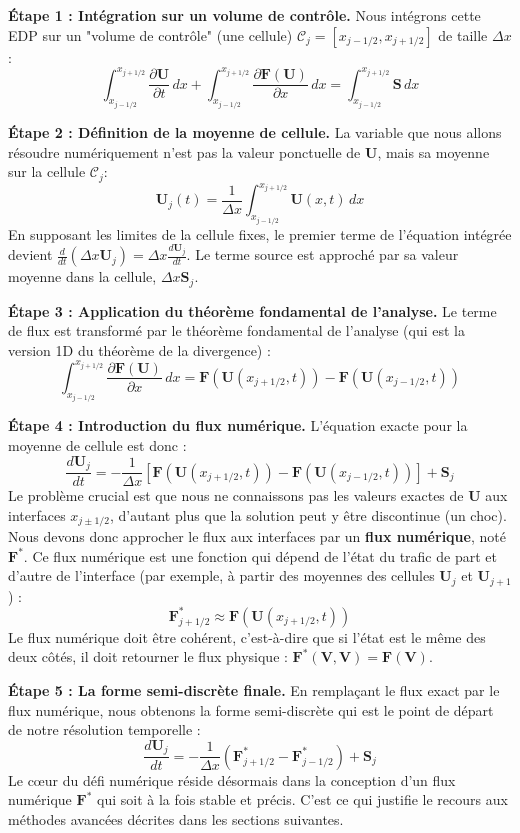 \textbf{Étape 1 : Intégration sur un volume de contrôle.}
Nous intégrons cette EDP sur un "volume de contrôle" (une cellule) $\mathcal{C}_j = [x_{j-1/2}, x_{j+1/2}]$ de taille $\Delta x$:
\[ \int_{x_{j-1/2}}^{x_{j+1/2}} \frac{\partial \mathbf{U}}{\partial t} \,dx + \int_{x_{j-1/2}}^{x_{j+1/2}} \frac{\partial \mathbf{F}(\mathbf{U})}{\partial x} \,dx = \int_{x_{j-1/2}}^{x_{j+1/2}} \mathbf{S} \,dx \]

\textbf{Étape 2 : Définition de la moyenne de cellule.}
La variable que nous allons résoudre numériquement n'est pas la valeur ponctuelle de $\mathbf{U}$, mais sa moyenne sur la cellule $\mathcal{C}_j$:
\[ \mathbf{U}_j(t) = \frac{1}{\Delta x} \int_{x_{j-1/2}}^{x_{j+1/2}} \mathbf{U}(x,t) \,dx \]
En supposant les limites de la cellule fixes, le premier terme de l'équation intégrée devient $\frac{d}{dt} (\Delta x \mathbf{U}_j) = \Delta x \frac{d\mathbf{U}_j}{dt}$. Le terme source est approché par sa valeur moyenne dans la cellule, $\Delta x \mathbf{S}_j$.

\textbf{Étape 3 : Application du théorème fondamental de l'analyse.}
Le terme de flux est transformé par le théorème fondamental de l'analyse (qui est la version 1D du théorème de la divergence) :
\[ \int_{x_{j-1/2}}^{x_{j+1/2}} \frac{\partial \mathbf{F}(\mathbf{U})}{\partial x} \,dx = \mathbf{F}(\mathbf{U}(x_{j+1/2}, t)) - \mathbf{F}(\mathbf{U}(x_{j-1/2}, t)) \]

\textbf{Étape 4 : Introduction du flux numérique.}
L'équation exacte pour la moyenne de cellule est donc :
\[ \frac{d\mathbf{U}_j}{dt} = - \frac{1}{\Delta x} \left[ \mathbf{F}(\mathbf{U}(x_{j+1/2}, t)) - \mathbf{F}(\mathbf{U}(x_{j-1/2}, t)) \right] + \mathbf{S}_j \]
Le problème crucial est que nous ne connaissons pas les valeurs exactes de $\mathbf{U}$ aux interfaces $x_{j\pm1/2}$, d'autant plus que la solution peut y être discontinue (un choc). Nous devons donc approcher le flux aux interfaces par un \textbf{flux numérique}, noté $\mathbf{F}^*$. Ce flux numérique est une fonction qui dépend de l'état du trafic de part et d'autre de l'interface (par exemple, à partir des moyennes des cellules $\mathbf{U}_j$ et $\mathbf{U}_{j+1}$) :
\[ \mathbf{F}^*_{j+1/2} \approx \mathbf{F}(\mathbf{U}(x_{j+1/2}, t)) \]
Le flux numérique doit être cohérent, c'est-à-dire que si l'état est le même des deux côtés, il doit retourner le flux physique : $\mathbf{F}^*(\mathbf{V}, \mathbf{V}) = \mathbf{F}(\mathbf{V})$.

\textbf{Étape 5 : La forme semi-discrète finale.}
En remplaçant le flux exact par le flux numérique, nous obtenons la forme semi-discrète qui est le point de départ de notre résolution temporelle :
\[ \frac{d\mathbf{U}_j}{dt} = - \frac{1}{\Delta x} (\mathbf{F}^*_{j+1/2} - \mathbf{F}^*_{j-1/2}) + \mathbf{S}_j \]
Le cœur du défi numérique réside désormais dans la conception d'un flux numérique $\mathbf{F}^*$ qui soit à la fois stable et précis. C'est ce qui justifie le recours aux méthodes avancées décrites dans les sections suivantes.

